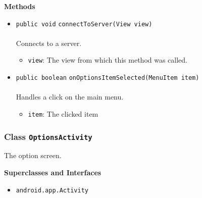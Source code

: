 \textbf{\sffamily Methods}
\begin{itemize}
\item \lstinline|public void| \lstinline|connectToServer|\lstinline|(View view)|\\ \\[-0.6em]
Connects to a server.
\begin{itemize}
\item \lstinline|view|: The view from which this method was called.
\end{itemize}



\item \lstinline|public boolean| \lstinline|onOptionsItemSelected|\lstinline|(MenuItem item)|\\ \\[-0.6em]
Handles a click on the main menu.
\begin{itemize}
\item \lstinline|item|: The clicked item
\end{itemize}



\end{itemize}

\subsubsection{Class \lstinline|OptionsActivity|}
The option screen. \\
\noindent\begin{minipage}[t]{5cm}
\vspace{0.3em}
\hspace*{2em}
\vspace{0.3em}
\end{minipage}



\textbf{\sffamily Superclasses and Interfaces}
\begin{itemize}
\item \lstinline|android.app.Activity|
\end{itemize}



